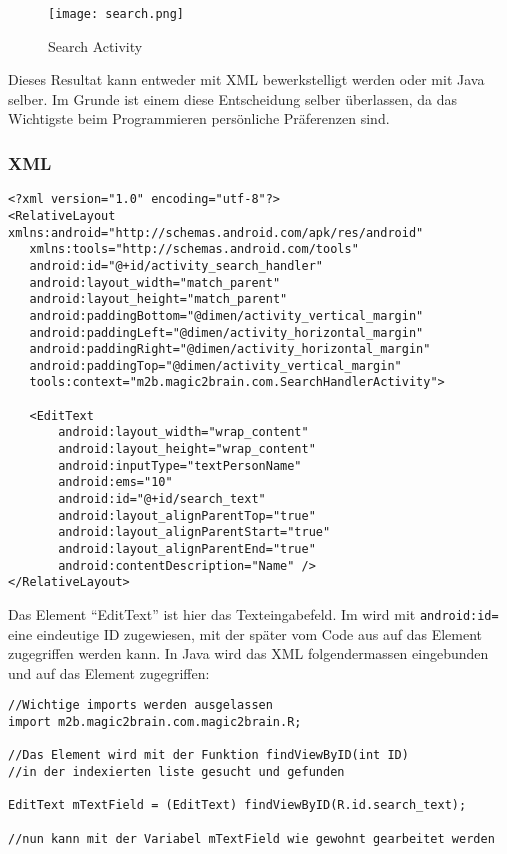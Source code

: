 \begin{figure}[htbp]
 \centering
    \texttt{[image: search.png]}
 \caption{Search Activity}
 \label{fig:SearchActivity}
\end{figure}

Dieses Resultat kann entweder mit XML bewerkstelligt werden oder mit Java selber. Im Grunde ist einem diese Entscheidung selber überlassen, da das Wichtigste beim Programmieren persönliche Präferenzen sind.

\subsubsection*{XML}
\begin{lstlisting}
<?xml version="1.0" encoding="utf-8"?>
<RelativeLayout xmlns:android="http://schemas.android.com/apk/res/android"
   xmlns:tools="http://schemas.android.com/tools"
   android:id="@+id/activity_search_handler"
   android:layout_width="match_parent"
   android:layout_height="match_parent"
   android:paddingBottom="@dimen/activity_vertical_margin"
   android:paddingLeft="@dimen/activity_horizontal_margin"
   android:paddingRight="@dimen/activity_horizontal_margin"
   android:paddingTop="@dimen/activity_vertical_margin"
   tools:context="m2b.magic2brain.com.SearchHandlerActivity">

   <EditText
       android:layout_width="wrap_content"
       android:layout_height="wrap_content"
       android:inputType="textPersonName"
       android:ems="10"
       android:id="@+id/search_text"
       android:layout_alignParentTop="true"
       android:layout_alignParentStart="true"
       android:layout_alignParentEnd="true"
       android:contentDescription="Name" />
</RelativeLayout>
\end{lstlisting}

Das Element "`EditText"' ist hier das Texteingabefeld. Im wird mit \verb|android:id=|  eine eindeutige ID zugewiesen, mit der später vom Code aus auf das Element zugegriffen werden kann.
In Java wird das XML folgendermassen eingebunden und auf das Element zugegriffen:
\begin{lstlisting}
//Wichtige imports werden ausgelassen
import m2b.magic2brain.com.magic2brain.R;

//Das Element wird mit der Funktion findViewByID(int ID)
//in der indexierten liste gesucht und gefunden

EditText mTextField = (EditText) findViewByID(R.id.search_text);

//nun kann mit der Variabel mTextField wie gewohnt gearbeitet werden
\end{lstlisting}

